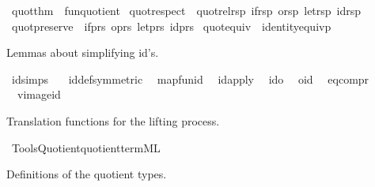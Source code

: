 \begin{isabellebody}
\isanewline
{}\isamarkupfalse%
\ {\isacharbrackleft}{\kern0pt}quot{\isacharunderscore}{\kern0pt}thm{\isacharbrackright}{\kern0pt}\ {\isacharequal}{\kern0pt}\ fun{\isacharunderscore}{\kern0pt}quotient{}\isanewline
{}\isamarkupfalse%
\ {\isacharbrackleft}{\kern0pt}quot{\isacharunderscore}{\kern0pt}respect{\isacharbrackright}{\kern0pt}\ {\isacharequal}{\kern0pt}\ quot{\isacharunderscore}{\kern0pt}rel{\isacharunderscore}{\kern0pt}rsp\ if{\isacharunderscore}{\kern0pt}rsp\ o{\isacharunderscore}{\kern0pt}rsp\ let{\isacharunderscore}{\kern0pt}rsp\ id{\isacharunderscore}{\kern0pt}rsp\isanewline
{}\isamarkupfalse%
\ {\isacharbrackleft}{\kern0pt}quot{\isacharunderscore}{\kern0pt}preserve{\isacharbrackright}{\kern0pt}\ {\isacharequal}{\kern0pt}\ if{\isacharunderscore}{\kern0pt}prs\ o{\isacharunderscore}{\kern0pt}prs\ let{\isacharunderscore}{\kern0pt}prs\ id{\isacharunderscore}{\kern0pt}prs\isanewline
{}\isamarkupfalse%
\ {\isacharbrackleft}{\kern0pt}quot{\isacharunderscore}{\kern0pt}equiv{\isacharbrackright}{\kern0pt}\ {\isacharequal}{\kern0pt}\ identity{\isacharunderscore}{\kern0pt}equivp%
\begin{isamarkuptext}%
Lemmas about simplifying id's.%
\end{isamarkuptext}\isamarkuptrue%
\isamarkupfalse%
\ {\isacharbrackleft}{\kern0pt}id{\isacharunderscore}{\kern0pt}simps{\isacharbrackright}{\kern0pt}\ {\isacharequal}{\kern0pt}\isanewline
\ \ id{\isacharunderscore}{\kern0pt}def{\isacharbrackleft}{\kern0pt}symmetric{\isacharbrackright}{\kern0pt}\isanewline
\ \ map{\isacharunderscore}{\kern0pt}fun{\isacharunderscore}{\kern0pt}id\isanewline
\ \ id{\isacharunderscore}{\kern0pt}apply\isanewline
\ \ id{\isacharunderscore}{\kern0pt}o\isanewline
\ \ o{\isacharunderscore}{\kern0pt}id\isanewline
\ \ eq{\isacharunderscore}{\kern0pt}comp{\isacharunderscore}{\kern0pt}r\isanewline
\ \ vimage{\isacharunderscore}{\kern0pt}id%
\begin{isamarkuptext}%
Translation functions for the lifting process.%
\end{isamarkuptext}\isamarkuptrue%
%
\isadelimML
%
\endisadelimML
%
\isatagML
{}\isamarkupfalse%
\ {\isacartoucheopen}Tools{\isacharslash}{\kern0pt}Quotient{\isacharslash}{\kern0pt}quotient{\isacharunderscore}{\kern0pt}term{\isachardot}{\kern0pt}ML{\isacartoucheclose}%
\endisatagML
{\isafoldML}%
%
\isadelimML
%
\endisadelimML
%
\begin{isamarkuptext}%
Definitions of the quotient types.%

\end{isamarkuptext}
\end{isabellebody}
